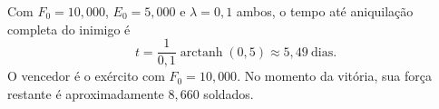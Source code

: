 Com $F_{0}=10{,}000$, $E_{0}=5{,}000$ e $\lambda=0{,}1$ ambos, o tempo até aniquilação completa do inimigo é
\[
t=\frac{1}{0{,}1}\operatorname{arctanh}(0{,}5)\approx5{,}49\ \mathrm{dias}.
\]
O vencedor é o exército com $F_{0}=10{,}000$. No momento da vitória, sua força restante é aproximadamente $8{,}660$ soldados. 